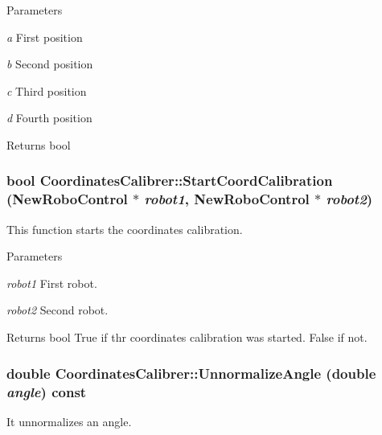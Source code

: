 \begin{DoxyParams}{Parameters}
\item[{\em a}]First position \item[{\em b}]Second position \item[{\em c}]Third position \item[{\em d}]Fourth position \end{DoxyParams}
\begin{DoxyReturn}{Returns}
bool 
\end{DoxyReturn}
\hypertarget{classCoordinatesCalibrer_a2087994adbb8651efcb06e3d7a2315da}{
\subsubsection[{StartCoordCalibration}]{\setlength{\rightskip}{0pt plus 5cm}bool CoordinatesCalibrer::StartCoordCalibration ({\bf NewRoboControl} $\ast$ {\em robot1}, \/  {\bf NewRoboControl} $\ast$ {\em robot2})}}
\label{classCoordinatesCalibrer_a2087994adbb8651efcb06e3d7a2315da}


This function starts the coordinates calibration. 


\begin{DoxyParams}{Parameters}
\item[{\em robot1}]First robot. \item[{\em robot2}]Second robot. \end{DoxyParams}
\begin{DoxyReturn}{Returns}
bool True if thr coordinates calibration was started. False if not. 
\end{DoxyReturn}
\hypertarget{classCoordinatesCalibrer_ab97fd4d3f3930aaff39cee1543022cb6}{
\subsubsection[{UnnormalizeAngle}]{\setlength{\rightskip}{0pt plus 5cm}double CoordinatesCalibrer::UnnormalizeAngle (double {\em angle}) const}}
\label{classCoordinatesCalibrer_ab97fd4d3f3930aaff39cee1543022cb6}


It unnormalizes an angle. 


